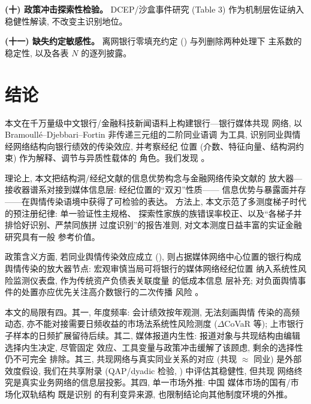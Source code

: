 \textbf{(十) 政策冲击探索性检验。} DCEP/沙盒事件研究 (Table 3)
作为机制层佐证纳入稳健性解读, 不改变主识别地位。

\textbf{(十一) 缺失约定敏感性。} 离网银行零填充约定
() 与列删除两种处理下
主系数的稳定性, 以及各表 $N$ 的逐列披露。


\section{结论}\label{sec:concl}

本文在千万量级中文银行/金融科技新闻语料上构建银行—银行媒体共现
网络, 以 Bramoullé--Djebbari--Fortin 非传递三元组的二阶同业语调
为工具, 识别同业舆情经网络结构向银行绩效的传染效应, 并考察经纪
位置 (介数、特征向量、结构洞约束) 作为解释、调节与异质性载体的
角色。我们发现 。

理论上, 本文把结构洞/经纪文献的信息优势构念与金融网络传染文献的
放大器—接收器谱系对接到媒体信息层: 经纪位置的``双刃''性质——
信息优势与暴露面并存——在舆情传染语境中获得了可检验的表达。
方法上, 本文示范了多测度梯子时代的预注册纪律: 单一验证性主规格、
探索性家族的族错误率校正、以及``各梯子并排恰好识别、严禁同族拼
过度识别''的报告准则, 对文本测度日益丰富的实证金融研究具有一般
参考价值。

政策含义方面, 若同业舆情传染效应成立
(), 则占据媒体网络中心位置的银行构成
舆情传染的放大器节点: 宏观审慎当局可将银行的媒体网络经纪位置
纳入系统性风险监测仪表盘, 作为传统资产负债表关联度量
\parencite{jackson2021systemic,duarte2021firesale} 的低成本信息
层补充; 对负面舆情事件的处置亦应优先关注高介数银行的二次传播
风险 \parencite{fang2024media,cookson2026social}。

本文的局限有四。其一, 年度频率: 会计绩效按年观测, 无法刻画舆情
传染的高频动态, 亦不能对接需要日频收益的市场法系统性风险测度
($\Delta$CoVaR 等); 上市银行子样本的日频扩展留待后续。其二,
媒体报道内生性: 报道对象与共现结构由编辑选择内生决定, 尽管固定
效应、工具变量与政策冲击缓解了该顾虑, 剩余的选择性仍不可完全
排除。其三, 共现网络与真实同业关系的对应 (共现 $\approx$ 同业)
是外部效度假设, 我们在共享附录 (QAP/dyadic 检验,
) 中评估其稳健性, 但共现
网络终究是真实业务网络的信息层投影。其四, 单一市场外推: 中国
媒体市场的国有/市场化双轨结构 \parencite{you2018power} 既是识别
的有利变异来源, 也限制结论向其他制度环境的外推。

\printbibliography


